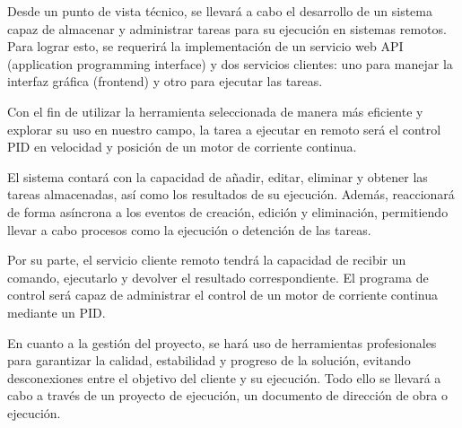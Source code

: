 Desde un punto de vista técnico, se llevará a cabo el desarrollo de un sistema capaz de almacenar y administrar tareas para su ejecución en sistemas remotos. Para lograr esto, se requerirá la implementación de un servicio web API (application programming interface) y dos servicios clientes: uno para manejar la interfaz gráfica (frontend) y otro para ejecutar las tareas.

Con el fin de utilizar la herramienta seleccionada de manera más eficiente y explorar su uso en nuestro campo, la tarea a ejecutar en remoto será el control PID en velocidad y posición de un motor de corriente continua.

El sistema contará con la capacidad de añadir, editar, eliminar y obtener las tareas almacenadas, así como los resultados de su ejecución. Además, reaccionará de forma asíncrona a los eventos de creación, edición y eliminación, permitiendo llevar a cabo procesos como la ejecución o detención de las tareas.

Por su parte, el servicio cliente remoto tendrá la capacidad de recibir un comando, ejecutarlo y devolver el resultado correspondiente. El programa de control será capaz de administrar el control de un motor de corriente continua mediante un PID.

En cuanto a la gestión del proyecto, se hará uso de herramientas profesionales para garantizar la calidad, estabilidad y progreso de la solución, evitando desconexiones entre el objetivo del cliente y su ejecución. Todo ello se llevará a cabo a través de un proyecto de ejecución, un documento de dirección de obra o ejecución.
